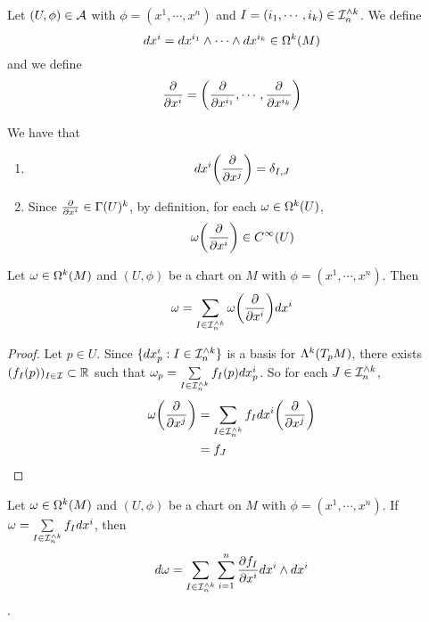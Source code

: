 \documentclass{book}
\begin{document}
	\begin{ex}
	
	\end{ex}

	\begin{defn}
		Let $(U, \phi) \in \mathcal{A}$ with $\phi = (x^1, \cdots, x^n)$ and $I = (i_1, \cdots, i_k) \in \mathcal{I}_n^{\wedge k}$. We define $$dx^i = dx^{i_1} \wedge \cdots \wedge dx^{i_k} \in \Omega^k(M)$$ 
		and we define $$\frac{\partial}{\partial x^i}= \bigg(\frac{\partial}{\partial x^{i_1}}, \cdots, \frac{\partial}{\partial x^{i_k}} \bigg)$$

	\end{defn}
	
	\begin{note} We have that
	\begin{enumerate}
	\item  $$d x^i \bigg (\frac{\partial}{\partial x^j} \bigg) = \delta_{I,J}$$
	\item Since $\frac{\partial}{\partial x^i} \in \Gamma(U)^k$, by definition, for each $\omega \in \Omega^k(U)$, $$\omega \bigg(\frac{\partial}{\partial x^i} \bigg) \in C^{\infty}(U)$$
	\end{enumerate}
	\end{note}

	\begin{ex}
		Let $\omega \in \Omega^k(M)$ and $(U, \phi)$ be a chart on $M$ with $\phi = (x^1, \cdots, x^n)$. Then $$\omega = \sum_{I \in \mathcal{I}_n^{\wedge k}}\omega \bigg(\frac{\partial}{\partial x^i} \bigg) dx^i$$
	\end{ex}

	\begin{proof}
		Let $p \in U$. Since $\{dx^i_p: I \in \mathcal{I}_n^{\wedge k}\}$ is a basis for $\Lambda^k(T_pM)$, there exists $(f_I(p))_{I \in \mathcal{I}} \subset \mathbb{R}$ such that $\omega_p = \sum\limits_{I \in \mathcal{I}_n^{\wedge k}} f_I(p) dx^i_p$. So for each $J \in \mathcal{I}_n^{\wedge k}$, 
		\begin{align*}
			\omega\bigg (\frac{\partial}{\partial x^j} \bigg ) 
			&= \sum\limits_{I \in \mathcal{I}_n^{\wedge k}} f_I dx^i \bigg (\frac{\partial}{\partial x^j} \bigg )  \\
			&= f_J
		\end{align*} 
	\end{proof}

	\begin{ex}
		Let $\omega \in \Omega^k(M)$ and $(U, \phi)$ be a chart on $M$ with $\phi = (x^1, \cdots, x^n)$. If $\omega = \sum\limits_{I \in \mathcal{I}_n^{\wedge k}}f_I dx^i$, then $$d \omega  = \sum_{I \in \mathcal{I}_n^{\wedge k}} \sum_{i =1}^n \frac{\partial f_I}{\partial x^i} dx^i \wedge dx^i$$.
	\end{ex}
\end{document}
